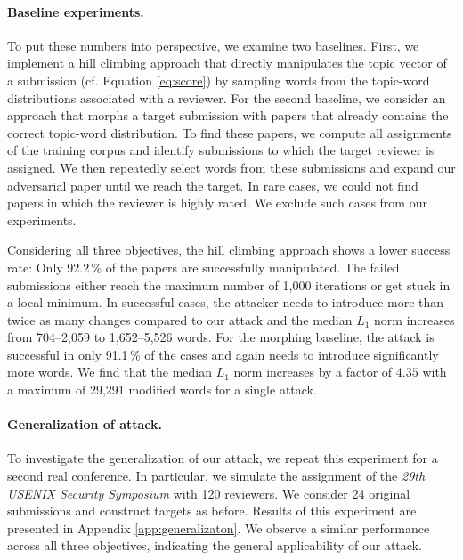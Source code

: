 \documentclass[letterpaper,twocolumn,10pt]{article}
\begin{document}
\paragraph{Baseline experiments.} To put these numbers into perspective, we examine two baselines. 
First, we implement a {hill\EndAccSupp{}} climbing approach that directly manipulates the topic vector of a submission (cf. Equation \ref{eq:score}) by sampling words from the topic-word distributions associated with a reviewer.
For the second baseline, we consider an approach that morphs a target submission with papers that already contains the correct topic-word distribution. 
To find these papers, we compute all assignments of the training corpus and identify submissions to which the target reviewer is assigned. We then repeatedly select words from these submissions and expand our adversarial paper until we reach the target. In rare cases, we could not find papers in which the reviewer is highly rated. We exclude such cases from our experiments.

Considering all three objectives, the {hill\EndAccSupp{}} climbing approach shows a lower success rate: Only 92.2\,\% of the papers are successfully manipulated. The failed submissions either reach the maximum number of 1,000 iterations or get stuck in a local minimum. In successful cases, the attacker needs to introduce more than twice as many changes compared to our attack and the median $L_1$ norm increases from 704--2,059 to 1,652--5,526 words. For the morphing baseline, the attack is successful in only 91.1\,\% of the cases and again needs to introduce significantly more words. We find that the median $L_1$ norm increases by a factor of $4.35$ with a maximum of 29,291 modified words for a single attack.

\paragraph{Generalization of attack.} 
To investigate the generalization of our attack, we repeat this experiment for a second real conference. In particular, we simulate the assignment of the \emph{29th USENIX Security Symposium} with 120 reviewers. We consider 24 original submissions and construct targets as before. Results of this experiment are presented in Appendix \ref{app:generalizaton}.
We observe a similar performance across all three objectives, indicating the general applicability of our attack.
\end{document}
